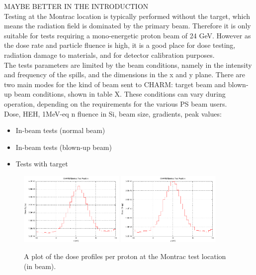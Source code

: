 \documentclass[main.tex]{subfiles}
\begin{document}
MAYBE BETTER IN THE INTRODUCTION \\

Testing at the Montrac location is typically performed without the target, which means the radiation field is dominated by the primary beam. Therefore it is only suitable for tests requiring a mono-energetic proton beam of 24 GeV. However as the dose rate and particle fluence is high, it is a good place for dose testing, radiation damage to materials, and for detector calibration purposes. \\

The tests parameters are limited by the beam conditions, namely in the intensity and frequency of the spills, and the dimensions in the x and y plane. There are two main modes for the kind of beam sent to CHARM: target beam and blown-up beam conditions, shown in table X. These conditions can vary during operation, depending on the requirements for the various PS beam users. \\



Dose, HEH, 1MeV-eq n fluence in Si, beam size, gradients, peak values:
\begin{itemize}
	\item In-beam tests (normal beam)
	\item In-beam tests (blown-up beam)
	\item Tests with target
\end{itemize}

\begin{figure}[!ht]
	\centering
	\includegraphics[width=0.45\textwidth]{./images/montrac_dose_1d_x}\quad
	\includegraphics[width=0.45\textwidth]{./images/montrac_dose_1d_y}
	\caption{A plot of the dose profiles per proton at the Montrac test location (in beam).}
	\label{fig:montrac_cp_OOOO_dose}
\end{figure}
\end{document}
